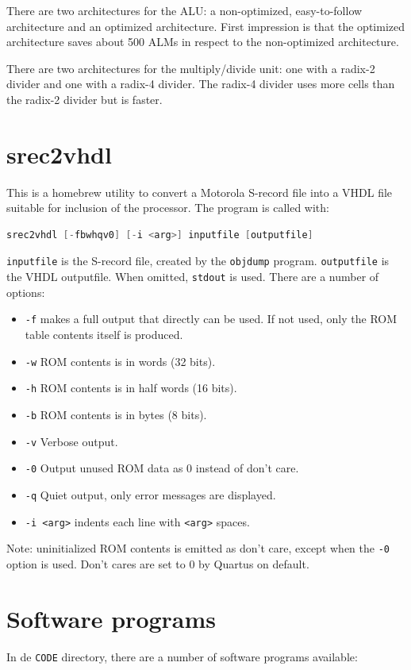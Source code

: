 \documentclass[12pt]{article}
\begin{document}
There are two architectures for the ALU: a non-optimized, easy-to-follow architecture and an optimized architecture. First impression is that the optimized architecture saves about 500 ALMs in respect to the non-optimized architecture.

There are two architectures for the multiply/divide unit: one with a radix-2 divider and one with a radix-4 divider. The radix-4 divider uses more cells than the radix-2 divider but is faster.

\section{srec2vhdl}
This is a homebrew utility to convert a Motorola S-record file into a VHDL file suitable for inclusion of the processor. The program is called with:

\begin{lstlisting}[language=c]
srec2vhdl [-fbwhqv0] [-i <arg>] inputfile [outputfile]
\end{lstlisting}

\texttt{inputfile} is the S-record file, created by the \texttt{objdump} program. \texttt{outputfile} is the VHDL outputfile. When omitted, \texttt{stdout} is used. There are a number of options:

\begin{itemize}
\item \texttt{-f} makes a full output that directly can be used. If not used, only the ROM table contents itself is produced.
\item \texttt{-w} ROM contents is in words (32 bits).
\item \texttt{-h} ROM contents is in half words (16 bits).
\item \texttt{-b} ROM contents is in bytes (8 bits).
\item \texttt{-v} Verbose output.
\item \texttt{-0} Output unused ROM data as 0 instead of don't care.
\item \texttt{-q} Quiet output, only error messages are displayed.
\item \texttt{-i <arg>} indents each line with \texttt{<arg>} spaces.
\end{itemize}

Note: uninitialized ROM contents is emitted as don't care, except when the \texttt{-0} option is used. Don't cares are set to 0 by Quartus on default.

\section{Software programs}
In de \texttt{CODE} directory, there are a number of software programs available:
\end{document}
